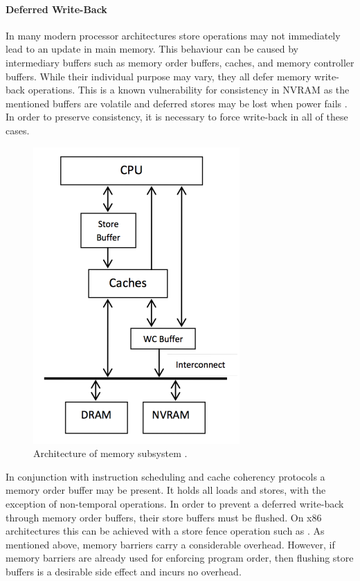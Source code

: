 \paragraph{Deferred Write-Back}

In many modern processor architectures store operations may not immediately
lead to an update in main memory. This behaviour can be caused by intermediary
buffers such as memory order buffers, caches, and memory controller buffers.
While their individual purpose may vary, they all defer memory write-back
operations. This is a known vulnerability for consistency in \ac{NVRAM} as the
mentioned buffers are volatile and deferred stores may be lost when power fails
\cite{condit2009better, oukid2017data}. In order to preserve consistency, it is
necessary to force write-back in all of these cases.

\begin{figure}[h!]
    \centering
    \includegraphics[scale=0.75]{figures/nvram-memory-subsystem.pdf}
    \caption{Architecture of memory subsystem \cite{bhandari2012implications}.}
    \label{fig:memory-interface}
\end{figure}


In conjunction with instruction scheduling and cache coherency protocols a
memory order buffer may be present. It holds all loads and stores, with the
exception of non-temporal operations. In order to prevent a deferred write-back
through memory order buffers, their store buffers must be flushed. On x86
architectures this can be achieved with a store fence operation such as
. As mentioned above, memory barriers carry a considerable
overhead. However, if memory barriers are already used for enforcing program
order, then flushing store buffers is a desirable side effect and incurs no
overhead.

